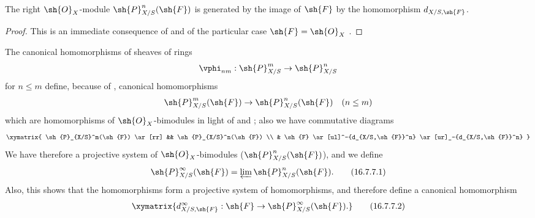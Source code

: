 \begin{proposition}[16.7.6]
\label{IV.16.7.6}
The right $\sh{O}_X$-module $\sh{P}_{X/S}^n(\sh{F})$ is generated by the image of $\sh{F}$ by the homomorphism $d_{X/S, \sh{F}}$.
\end{proposition}

\begin{proof}
This is an immediate consequence of  and of the particular case $\sh{F} = \sh{O}_X$ .
\end{proof}

\begin{env}[16.7.7]
\label{IV.16.7.7}
The canonical homomorphisms of sheaves of rings
\[
  \vphi_{nm}:\sh{P}_{X/S}^m \to \sh{P}_{X/S}^n 
\]
for $n \leq m$  define, because of , canonical homomorphisms 
\[
  \sh{P}_{X/S}^m(\sh{F}) \to \sh{P}_{X/S}^n(\sh{F}) \quad (n \leq m)
\]
which are homomorphisms of $\sh{O}_X$-bimodules in light of  and ;
also we have commutative diagrams
\[
  \xymatrix{
    \sh{P}_{X/S}^m(\sh{F}) \ar[rr] && \sh{P}_{X/S}^n(\sh{F}) \\
      & \sh{F} \ar[ul]^-{d_{X/S,\sh{F}}^n} \ar[ur]_-{d_{X/S,\sh{F}}^n}
  }
\]
We have therefore a projective system of $\sh{O}_X$-bimodules ($\sh{P}_{X/S}^n(\sh{F})$), and we define
\[
  \label{IV.16.7.7.1}
  \sh{P}_{X/S}^\infty(\sh{F}) = \varprojlim \sh{P}_{X/S}^n(\sh{F}).
  \tag{16.7.7.1}
\]
Also, this shows that the homomorphisms  form a projective system of homomorphisms, and therefore define a canonical homomorphism
\[
  \label{IV.16.7.7.2}
  \xymatrix{
    d_{X/S,\sh{F}}^\infty: \sh{F} \to \sh{P}_{X/S}^\infty(\sh{F}).
  }
  \tag{16.7.7.2}
\]
\end{env}


